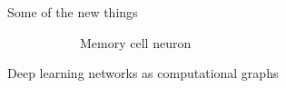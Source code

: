 \documentclass[10pt]{beamer}
\begin{document}
\begin{frame}{Some of the new things}
\begin{figure}
\begin{subfigure}{0.3\textwidth}
{			Memory cell neuron}
		\end{subfigure}%
		\begin{subfigure}{0.4\textwidth}
			\centering
		\end{subfigure}
	\end{figure}
\end{frame}

\begin{frame}{Deep learning networks as computational graphs}
\end{frame}
\end{document}
